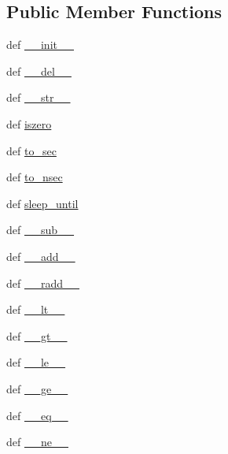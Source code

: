 \subsection*{Public Member Functions}
\begin{DoxyCompactItemize}
\item 
def \hyperlink{classcyber__py_1_1cyber__time_1_1Time_a10900825547906e8ce4d313cee2d94c6}{\-\_\-\-\_\-init\-\_\-\-\_\-}
\item 
def \hyperlink{classcyber__py_1_1cyber__time_1_1Time_aa41a2cfe16b372cab9a6e4e6ca18dac6}{\-\_\-\-\_\-del\-\_\-\-\_\-}
\item 
def \hyperlink{classcyber__py_1_1cyber__time_1_1Time_af88bec77617035d6054c9e892d5d62d0}{\-\_\-\-\_\-str\-\_\-\-\_\-}
\item 
def \hyperlink{classcyber__py_1_1cyber__time_1_1Time_aac227f91d90eb20b1704b8599f3d3af2}{iszero}
\item 
def \hyperlink{classcyber__py_1_1cyber__time_1_1Time_adcb2662bc1356197324062e53991f9ca}{to\-\_\-sec}
\item 
def \hyperlink{classcyber__py_1_1cyber__time_1_1Time_a60ed50a64dcf3b4effb8f7ebc45b4080}{to\-\_\-nsec}
\item 
def \hyperlink{classcyber__py_1_1cyber__time_1_1Time_a96b7103da36bd95764ce4f3d7aa8d0cd}{sleep\-\_\-until}
\item 
def \hyperlink{classcyber__py_1_1cyber__time_1_1Time_ae14102acffa6d707b4aef95d54d22bcd}{\-\_\-\-\_\-sub\-\_\-\-\_\-}
\item 
def \hyperlink{classcyber__py_1_1cyber__time_1_1Time_ad301fe1c623fcaa151ee95dded4049b3}{\-\_\-\-\_\-add\-\_\-\-\_\-}
\item 
def \hyperlink{classcyber__py_1_1cyber__time_1_1Time_a6f2903d2efc1c823e2ee19b9560f49a2}{\-\_\-\-\_\-radd\-\_\-\-\_\-}
\item 
def \hyperlink{classcyber__py_1_1cyber__time_1_1Time_a9f904f85ef0b1edddbe4002c5b276a81}{\-\_\-\-\_\-lt\-\_\-\-\_\-}
\item 
def \hyperlink{classcyber__py_1_1cyber__time_1_1Time_a1d33cc7f8de4afa4bd502249f60b402a}{\-\_\-\-\_\-gt\-\_\-\-\_\-}
\item 
def \hyperlink{classcyber__py_1_1cyber__time_1_1Time_a27ddc11ebbbd48aec91c41ac951e18ba}{\-\_\-\-\_\-le\-\_\-\-\_\-}
\item 
def \hyperlink{classcyber__py_1_1cyber__time_1_1Time_ad90eaaf4f702da516415fd153d0dbf15}{\-\_\-\-\_\-ge\-\_\-\-\_\-}
\item 
def \hyperlink{classcyber__py_1_1cyber__time_1_1Time_a034abca293a5e4a54e5f0190f66ff4d5}{\-\_\-\-\_\-eq\-\_\-\-\_\-}
\item 
def \hyperlink{classcyber__py_1_1cyber__time_1_1Time_a6e944bde380e451303866b3079a3f945}{\-\_\-\-\_\-ne\-\_\-\-\_\-}
\end{DoxyCompactItemize}
